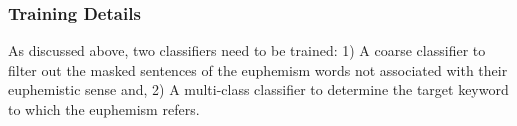 




\subsubsection{Training Details}
\label{sec:iden_approach}
As discussed above, two classifiers need to be trained: 
1) A coarse classifier to filter out the masked sentences of the euphemism words not associated with their euphemistic sense
and, 2) A multi-class classifier to determine the target keyword to which the euphemism refers. 

